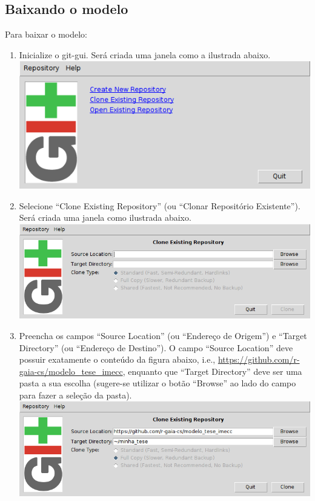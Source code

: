 \subsection{Baixando o modelo}
Para baixar o modelo:
\begin{enumerate}
  \item Inicialize o git-gui. Será criada uma janela como a ilustrada abaixo.\\
    \includegraphics[scale=.6]{figuras/git-gui00-0}
  \item Selecione ``Clone Existing Repository'' (ou ``Clonar Repositório
    Existente''). Será criada uma janela como ilustrada abaixo.\\
    \includegraphics[scale=.6]{figuras/git-gui01}\\
  \item Preencha os campos ``Source Location'' (ou ``Endereço de Origem'') e
    ``Target Directory'' (ou ``Endereço de Destino''). O campo ``Source
    Location'' deve possuir exatamente o conteúdo da figura abaixo, i.e.,
    \url{https://github.com/r-gaia-cs/modelo_tese_imecc}, enquanto que ``Target
    Directory'' deve ser uma pasta a sua escolha (sugere-se utilizar o botão
    ``Browse'' ao lado do campo para fazer a seleção da pasta).\\
    \includegraphics[scale=.6]{figuras/git-gui02}

\end{enumerate}
